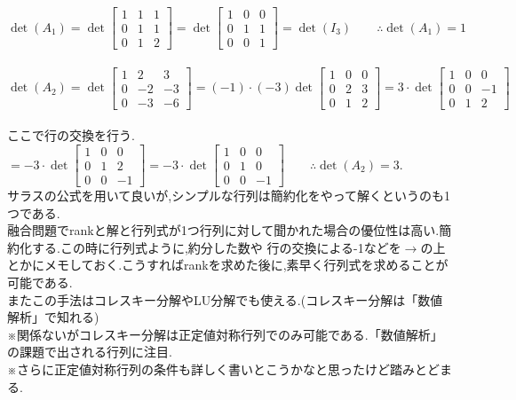 \[\det(A_1) = \det
\begin{bmatrix}
    1 & 1 & 1 \\
    0 & 1 & 1 \\
    0 & 1 & 2
\end{bmatrix}= \det
\begin{bmatrix}
    1 & 0 & 0 \\
    0 & 1 & 1 \\
    0 & 0 & 1
\end{bmatrix}= \det
(I_3) \qquad\therefore \det(A_1) = 1\]\\
\hspace{2cm}$\det(A_2) = \det
\begin{bmatrix}
    1 & 2 & 3 \\
    0 & -2 & -3 \\
    0 & -3 & -6
\end{bmatrix}= (-1) \cdot (-3)\det
\begin{bmatrix}
    1 & 0 & 0 \\
    0 & 2 & 3 \\
    0 & 1 & 2
\end{bmatrix}= 3 \cdot \det
\begin{bmatrix}
    1 & 0 & 0 \\
    0 & 0 & -1 \\
    0 & 1 & 2
\end{bmatrix}$\\\\
ここで行の交換を行う.\\
\hspace{3.5cm}$=-3\cdot \det
\begin{bmatrix}
    1 & 0 & 0 \\
    0 & 1 & 2 \\
    0 & 0 & -1 
\end{bmatrix}=-3\cdot \det
\begin{bmatrix}
    1 & 0 & 0 \\
    0 & 1 & 0 \\
    0 & 0 & -1
\end{bmatrix} \qquad \therefore \det(A_2)= 3.$\\
サラスの公式を用いて良いが,シンプルな行列は簡約化をやって解くというのも1つである.\\
融合問題でrankと解と行列式が1つ行列に対して聞かれた場合の優位性は高い.簡約化する.この時に行列式ように,約分した数や
行の交換による-1などを$\rightarrow$の上とかにメモしておく.こうすればrankを求めた後に,素早く行列式を求めることが可能である.\\
またこの手法はコレスキー分解やLU分解でも使える.(コレスキー分解は「数値解析」で知れる)\\
※関係ないがコレスキー分解は正定値対称行列でのみ可能である.「数値解析」の課題で出される行列に注目.\\
※さらに正定値対称行列の条件も詳しく書いとこうかなと思ったけど踏みとどまる.\\
